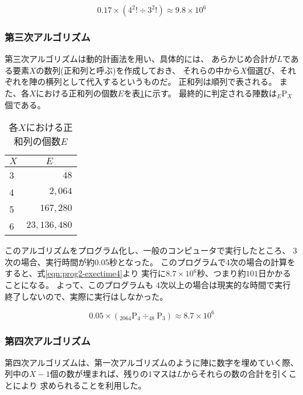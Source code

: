 \begin{equation} \label{eqn:prog1.5-exectime4}
0.17 \times (4^2! \div 3^2!) \approx 9.8 \times 10^6
\end{equation}

\subsubsection{第三次アルゴリズム}
第三次アルゴリズムは動的計画法を用い、具体的には、
あらかじめ合計が$L$である要素$X$の数列(正和列と呼ぶ)を作成しておき、
それらの中から$X$個選び、それぞれを陣の横列として代入するというものだ。
正和列は順列で表される。
また、各$X$における正和列の個数$E$を表\ref{tab:ple-each-X}に示す。
最終的に判定される陣数は$_E \mathrm{P} _X$個である。

\begin{table}[htb]
	\begin{center}
	\begin{tabular}{|l|r|}
\hline \hline
\multicolumn{1}{|c|}{$X$} & \multicolumn{1}{|c|}{$E$} \\
\hline \hline
3 & $48$ \\
4 & $2,064$ \\
5 & $167,280$ \\
6 & $23,136,480$ \\
\hline
	\end{tabular}
	\end{center}
	\caption{各$X$における正和列の個数$E$}
	\label{tab:ple-each-X}
\end{table}

このアルゴリズムをプログラム化し、一般のコンピュータで実行したところ、
3次の場合、実行時間が約0.05秒となった。
このプログラムで4次の場合の計算をすると、式\ref{eqn:prog2-exectime4}より
実行に$8.7 \times 10^6$秒、つまり約$101$日かかることになる。
よって、このプログラムも
4次以上の場合は現実的な時間で実行終了しないので、実際に実行はしなかった。

\begin{equation} \label{eqn:prog2-exectime4}
0.05 \times (_{2064} \mathrm{P} _4 \div _{48} \mathrm{P} _3) \approx 8.7 \times 10^6
\end{equation}

\subsubsection{第四次アルゴリズム}
第四次アルゴリズムは、第一次アルゴリズムのように陣に数字を埋めていく際、
列中の$X-1$個の数が埋まれば、残りの$1$マスは$L$からそれらの数の合計を引くことにより
求められることを利用した。

